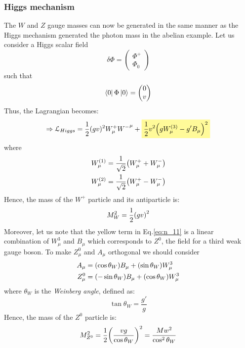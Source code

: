 \documentclass[../main/main.tex]{subfiles}
\begin{document}
\subsubsection{Higgs mechanism}
The \( W \)  and \( Z \)  gauge masses can now be generated in the same manner as the Higgs mechanism generated the photon mass in the abelian example.
Let us consider a Higgs scalar field
\begin{equation*}
  \delta \Phi = \begin{pmatrix}
  \Phi ^+ \\
  \Phi _0
  \end{pmatrix}
\end{equation*}
such that
\begin{equation*}
  \bra{0} \Phi \ket{0} = \begin{pmatrix}
  0 \\
  v
  \end{pmatrix}
\end{equation*}
Thus, the Lagrangian becomes:
\begin{equation}
  \Rightarrow \mathcal{L}_{Higgs} = \frac{1}{2} (g v )^2 W_ \mu ^+ {W^-}^\mu
  + \mathcolorbox{yellow!40}{\frac{1}{2} v^2 \qty(g W _ \mu ^{(3)} - g' B _ \mu )^2}
  \label{eq:n_11}
\end{equation}
where
\begin{subequations}
\begin{align*}
  W_ \mu ^{(1)} &=  \frac{1}{\sqrt{2} } \qty(W_ \mu ^+ + W _ \mu ^-) \\
  W_ \mu ^{(2)} &=  \frac{1}{\sqrt{2} } \qty(W_ \mu ^+ - W _ \mu ^-)
\end{align*}
\end{subequations}
Hence, the mass of the \( W^+ \) particle and its antiparticle is:
\begin{equation*}
  M_W^2 = \frac{1}{2} \qty(g v)^2
\end{equation*}
Moreover, let us note that the yellow term in Eq.\eqref{eq:n_11} is a linear combination of \( W_ \mu ^3 \) and \( B_ \mu  \) which corresponds to \( Z^0 \), the field for a third weak gauge boson.
To make \( Z_ \mu ^0 \) and \( A _ \mu  \) orthogonal we should consider
\begin{subequations}
\begin{align*}
  A_ \mu  &=  \qty(\cos \theta _W) B _ \mu  + \qty(\sin \theta _W ) W_ \mu ^3 \\
  Z_ \mu ^0 & = \qty(- \sin \theta _W ) B _ \mu + \qty(\cos \theta _W ) W_ \mu ^3
\end{align*}
\end{subequations}
where \( \theta _W \) is the \emph{Weinberg angle}, defined as:
\begin{equation*}
  \tan \theta _W = \frac{g'}{g}
\end{equation*}
Hence, the mass of the \( Z^0 \) particle is:
\begin{equation*}
  M_ {Z^0}^2 = \frac{1}{2} \qty(\frac{vg}{\cos \theta _W})^2 = \frac{M w^2}{\cos^2 \theta _W}
\end{equation*}
\end{document}
